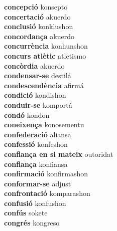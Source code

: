 \textbf{ concepció  } konsepto \\
\textbf{ concertació  } akuerdo \\
\textbf{ conclusió  } konklushon \\
\textbf{ concordança  } akuerdo \\
\textbf{ concurrència  } konhunshon \\
\textbf{ concurs atlètic  } atletismo \\
\textbf{ concòrdia  } akuerdo \\
\textbf{ condensar-se  } destilá \\
\textbf{ condescendència  } afirmá \\
\textbf{ condició  } kondishon \\
\textbf{ conduir-se  } komportá \\
\textbf{ condó  } kondon \\
\textbf{ coneixença  } konosementu \\
\textbf{ confederació  } aliansa \\
\textbf{ confessió  } konfeshon \\
\textbf{ confiança en si mateix  } outoridat \\
\textbf{ confiança  } konfiansa \\
\textbf{ confirmació  } konfirmashon \\
\textbf{ conformar-se  } adjust \\
\textbf{ confrontació  } komparashon \\
\textbf{ confusió  } konfushon \\
\textbf{ confús  } sokete \\
\textbf{ congrés  } kongreso \\
